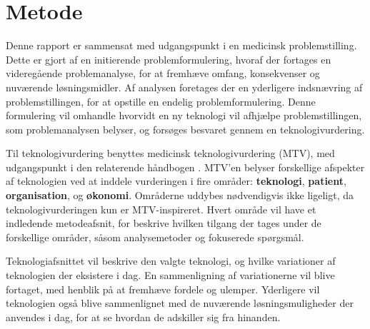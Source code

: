 \chapter{Metode} \label{metode}

Denne rapport er sammensat med udgangspunkt i en medicinsk problemstilling. 
Dette er gjort af en initierende problemformulering, hvoraf der fortages en videregående problemanalyse, for at fremhæve omfang, konsekvenser og nuværende løsningsmidler. 
Af analysen foretages der en yderligere indsnævring af problemstillingen, for at opstille en endelig problemformulering. Denne formulering vil omhandle hvorvidt en ny teknologi vil afhjælpe problemstillingen, som problemanalysen belyser, og forsøges besvaret gennem en teknologivurdering. 


Til teknologivurdering benyttes medicinsk teknologivurdering (MTV), med udgangspunkt i den relaterende håndbogen \citep{mtvhaandbog}. 
MTV'en belyser forskellige afspekter af teknologien ved at inddele vurderingen i fire områder: \textbf{teknologi}, \textbf{patient}, \textbf{organisation}, og \textbf{økonomi}. Områderne uddybes nødvendigvis ikke ligeligt, da teknologivurderingen kun er MTV-inspireret. 
Hvert område vil have et indledende metodeafsnit, for beskrive hvilken tilgang der tages under de forskellige områder, såsom analysemetoder og fokuserede spørgsmål. 

%


Teknologiafsnittet vil beskrive den valgte teknologi, og hvilke variationer af teknologien der eksistere i dag. En sammenligning af variationerne vil blive fortaget, med henblik på at fremhæve fordele og ulemper. Yderligere vil teknologien også blive sammenlignet med de nuværende løsningsmuligheder der anvendes i dag, for at se hvordan de adskiller sig fra hinanden.  
 

